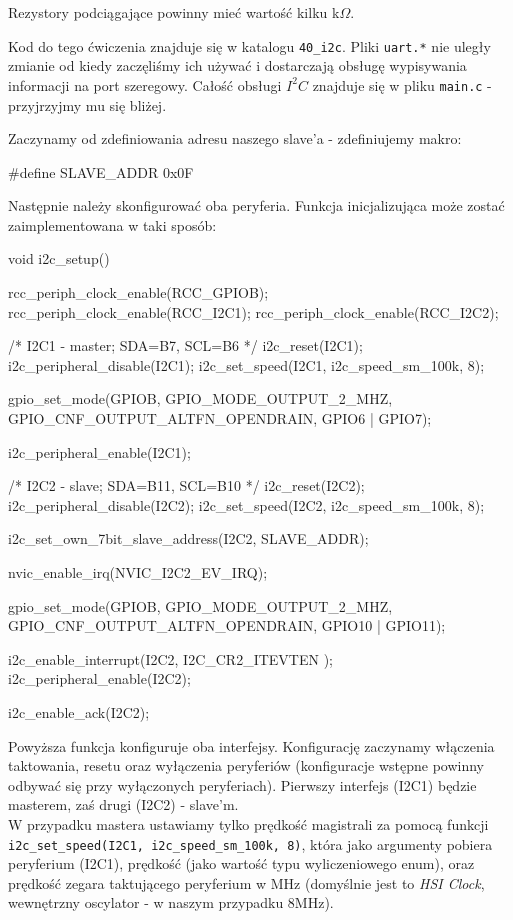 Rezystory podciągające powinny mieć wartość kilku k$\Omega$.

Kod do tego ćwiczenia znajduje się w katalogu \Verb$40_i2c$.
Pliki \Verb$uart.*$ nie uległy zmianie od kiedy zaczęliśmy ich używać i dostarczają obsługę wypisywania informacji na port szeregowy.
Całość obsługi $I^2C$ znajduje się w pliku \Verb$main.c$ - przyjrzyjmy mu się bliżej.

Zaczynamy od zdefiniowania adresu naszego slave'a - zdefiniujemy makro:

\begin{CodeFrame*}[c]{}
#define SLAVE_ADDR 0x0F
\end{CodeFrame*}

Następnie należy skonfigurować oba peryferia. Funkcja inicjalizująca może zostać zaimplementowana w taki sposób:

\begin{CodeFrame*}[c]{}
void i2c_setup(){
  rcc_periph_clock_enable(RCC_GPIOB);
  rcc_periph_clock_enable(RCC_I2C1);
  rcc_periph_clock_enable(RCC_I2C2);


  /* I2C1 - master; SDA=B7, SCL=B6 */
  i2c_reset(I2C1);
  i2c_peripheral_disable(I2C1);
  i2c_set_speed(I2C1, i2c_speed_sm_100k, 8);

  gpio_set_mode(GPIOB, GPIO_MODE_OUTPUT_2_MHZ,
		  GPIO_CNF_OUTPUT_ALTFN_OPENDRAIN, GPIO6 | GPIO7);
  
  i2c_peripheral_enable(I2C1);


  /* I2C2 - slave; SDA=B11, SCL=B10 */
  i2c_reset(I2C2);
  i2c_peripheral_disable(I2C2);
  i2c_set_speed(I2C2, i2c_speed_sm_100k, 8);

  i2c_set_own_7bit_slave_address(I2C2, SLAVE_ADDR);

  nvic_enable_irq(NVIC_I2C2_EV_IRQ);
  
  gpio_set_mode(GPIOB, GPIO_MODE_OUTPUT_2_MHZ,
		  GPIO_CNF_OUTPUT_ALTFN_OPENDRAIN, GPIO10 | GPIO11);

  i2c_enable_interrupt(I2C2, I2C_CR2_ITEVTEN );
  i2c_peripheral_enable(I2C2);

  
  i2c_enable_ack(I2C2);
}
\end{CodeFrame*}

Powyższa funkcja konfiguruje oba interfejsy. Konfigurację zaczynamy włączenia taktowania, resetu oraz wyłączenia peryferiów (konfiguracje wstępne
powinny odbywać się przy wyłączonych peryferiach). Pierwszy interfejs (I2C1) będzie masterem,
zaś drugi (I2C2) - slave'm.\\

W przypadku mastera ustawiamy tylko prędkość magistrali za pomocą funkcji
\Verb$i2c_set_speed(I2C1, i2c_speed_sm_100k, 8)$, która jako argumenty pobiera peryferium (I2C1), prędkość (jako wartość typu wyliczeniowego enum),
oraz prędkość zegara taktującego peryferium w MHz (domyślnie jest to \textit{HSI Clock}, wewnętrzny oscylator - w naszym przypadku 8MHz).\\

